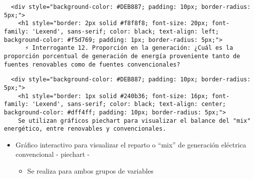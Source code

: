 \documentclass[11pt]{article}
\providecommand{\tightlist}{%
      \setlength{\itemsep}{0pt}\setlength{\parskip}{0pt}}
\begin{document}
    \begin{verbatim}
  <div style="background-color: #DEB887; padding: 10px; border-radius: 5px;">
    <h1 style="border: 2px solid #f8f8f8; font-size: 20px; font-family: 'Lexend', sans-serif; color: black; text-align: left; background-color: #f5d769; padding: 1px; border-radius: 5px;">
      ⚡ Interrogante 12. Proporción en la generación: ¿Cuál es la proporción porcentual de generación de energía proveniente tanto de fuentes renovables como de fuentes convencionales?
\end{verbatim}

    \begin{verbatim}
  <div style="background-color: #DEB887; padding: 10px; border-radius: 5px;">
    <h1 style="border: 1px solid #240b36; font-size: 16px; font-family: 'Lexend', sans-serif; color: black; text-align: center; background-color: #dff4ff; padding: 10px; border-radius: 5px;">
    Se utilizan gráficos piechart para visualizar el balance del "mix" energético, entre renovables y convencionales.
\end{verbatim}

    \begin{itemize}
\tightlist
\item
  Gráfico interactivo para visualizar el reparto o ``mix'' de generación
  eléctrica convencional - piechart -

  \begin{itemize}
  \tightlist
  \item
    Se realiza para ambos grupos de variables
  \end{itemize}
\end{itemize}
\end{document}
